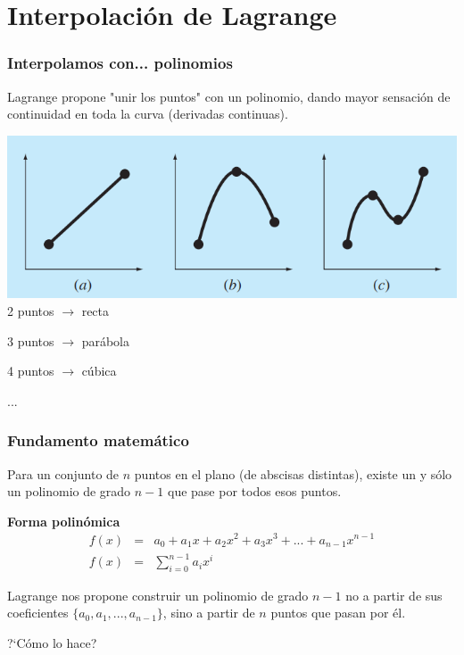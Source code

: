 \documentclass[11pt,xcolor={rgb}]{beamer}
\begin{document}
\section{Interpolaci\'on de Lagrange}

\begin{frame}[fragile=singleslide]
\frametitle{Interpolamos con... polinomios}
Lagrange propone "unir los puntos" con un polinomio, dando mayor sensaci\'on de continuidad en toda la curva (derivadas continuas).
\begin{center}
	\includegraphics[scale=0.5]{interpolaciones}
	\vfill
	2 puntos $\rightarrow$ recta
	
	3 puntos $\rightarrow$ par\'abola
	
	4 puntos $\rightarrow$ c\'ubica
	
	...
\end{center}
\end{frame}

\begin{frame}[fragile=singleslide]
\frametitle{Fundamento matem\'atico}

Para un conjunto de $n$ puntos en el plano (de abscisas distintas), existe un y s\'olo un polinomio de grado $n-1$ que pase por todos esos puntos.
\linebreak

\textbf{Forma polin\'omica}
\begin{eqnarray}
f(x) &=& a_0 + a_1 x + a_2 x^2 + a_3 x^3 + ... + a_{n-1} x^{n-1}\\
f(x) &=& \sum\limits_{i=0}^{n-1}a_i x^i
\end{eqnarray}

Lagrange nos propone construir un polinomio de grado $n-1$ no a partir de sus coeficientes $\{a_0, a_1, ..., a_{n-1} \}$, sino a partir de $n$ puntos que pasan por \'el.

?`C\'omo lo hace?

\end{frame}
\end{document}

